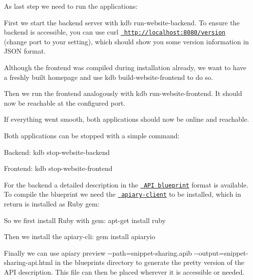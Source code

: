 As last step we need to run the applications\+:


\begin{DoxyItemize}
\item First we start the backend server with {\ttfamily kdb run-\/website-\/backend}. To ensure the backend is accessible, you can use {\ttfamily curl \href{http://localhost:8080/version}{\texttt{ http\+://localhost\+:8080/version}}} (change port to your setting), which should show you some version information in J\+S\+ON format.
\item Although the frontend was compiled during installation already, we want to have a freshly built homepage and use {\ttfamily kdb build-\/website-\/frontend} to do so.
\item Then we run the frontend analogously with {\ttfamily kdb run-\/website-\/frontend}. It should now be reachable at the configured port.
\end{DoxyItemize}

If everything went smooth, both applications should now be online and reachable.

Both applications can be stopped with a simple command\+:


\begin{DoxyItemize}
\item Backend\+: {\ttfamily kdb stop-\/website-\/backend}
\item Frontend\+: {\ttfamily kdb stop-\/website-\/frontend}
\end{DoxyItemize}

For the backend a detailed description in the \href{https://apiblueprint.org/}{\texttt{ A\+PI blueprint}} format is available. To compile the blueprint we need the \href{https://github.com/apiaryio/apiary-client}{\texttt{ apiary-\/client}} to be installed, which in return is installed as Ruby gem\+:


\begin{DoxyItemize}
\item So we first install Ruby with gem\+: {\ttfamily apt-\/get install ruby}
\item Then we install the apiary-\/cli\+: {\ttfamily gem install apiaryio}
\item Finally we can use {\ttfamily apiary preview -\/-\/path=snippet-\/sharing.\+apib -\/-\/output=snippet-\/sharing-\/api.\+html} in the blueprints directory to generate the pretty version of the A\+PI description. This file can then be placed wherever it is accessible or needed.
\end{DoxyItemize}

